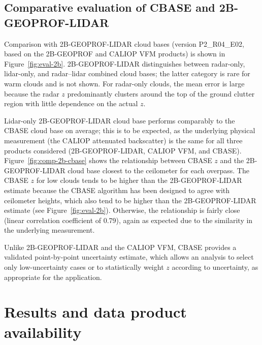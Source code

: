\documentclass[essd,manuscript]{copernicus}\usepackage[]{graphicx}\usepackage[]{color}
\newcommand\CBH{\ensuremath{z}}
\begin{document}
\subsection{Comparative evaluation of CBASE and 2B-GEOPROF-LIDAR}

Comparison with 2B-GEOPROF-LIDAR cloud bases (version P2\_R04\_E02, based on the
2B-GEOPROF and CALIOP VFM products) is shown in Figure~\ref{fig:eval-2b}.
2B-GEOPROF-LIDAR distinguishes between radar-only, lidar-only, and radar--lidar
combined cloud bases; the latter category is rare for warm clouds and is not
shown.  For radar-only clouds, the mean error is large because the radar \CBH{}
predominantly clusters around the top of the ground clutter region with little
dependence on the actual \CBH{}.  

Lidar-only 2B-GEOPROF-LIDAR cloud base performs comparably to the CBASE cloud
base on average; this is to be expected, as the underlying physical measurement
(the CALIOP attenuated backscatter) is the same for all three products
considered (2B-GEOPROF-LIDAR, CALIOP VFM, and CBASE).
Figure~\ref{fig:comp-2b-cbase} shows the relationship between CBASE \CBH{} and
the 2B-GEOPROF-LIDAR cloud base closest to the ceilometer for each overpass.
The CBASE \CBH{} for low clouds tends to be higher than the 2B-GEOPROF-LIDAR
estimate because the CBASE algorithm has been designed to agree with ceilometer
heights, which also tend to be higher than the 2B-GEOPROF-LIDAR estimate (see
Figure~\ref{fig:eval-2b}).  Otherwise, the relationship is fairly close (linear
correlation coefficient of 0.79), again as expected due to the similarity in the
underlying measurement.

Unlike 2B-GEOPROF-LIDAR and the CALIOP VFM, CBASE provides a validated
point-by-point uncertainty estimate, which allows an analysis to select only
low-uncertainty cases or to statistically weight \CBH{} according to
uncertainty, as appropriate for the application.

\section{Results and data product availability}
\label{sec:results}
\end{document}

